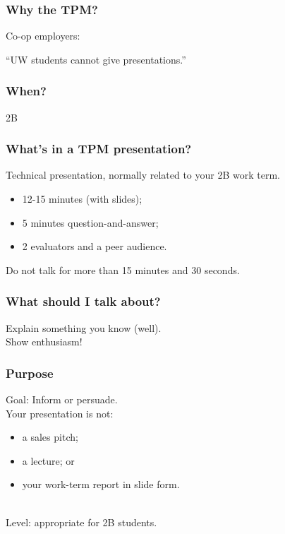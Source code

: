 \documentclass{beamer}
\begin{document}
\begin{frame}
\frametitle{Why the TPM?}

\Large
Co-op employers:

\begin{center}
``UW students cannot give presentations.''
\end{center}

\end{frame}

\begin{frame}

\frametitle{When?}

\begin{center}
{\Large 2B}
\end{center}

\end{frame}

\begin{frame}

\frametitle{What's in a TPM presentation?}

Technical presentation, normally related to your 2B work term.

\begin{itemize}
\item 12-15 minutes (with slides);
\item 5 minutes question-and-answer; 
\item 2 evaluators and a peer audience.
\end{itemize}

Do not talk for more than 15 minutes and 30 seconds.

\end{frame}

\begin{frame}

\frametitle{What should I talk about?}

\Large
Explain something you know (well).\\[2em]

Show enthusiasm!

\end{frame}

\begin{frame}

\frametitle{Purpose}

\Large
Goal: Inform or persuade.\\[2em]

Your presentation is not:
\begin{itemize}
\item a sales pitch;
\item a lecture; or
\item your work-term report in slide form.
\end{itemize}
~\\[1em]

Level: appropriate for 2B students.

\end{frame}
\end{document}

